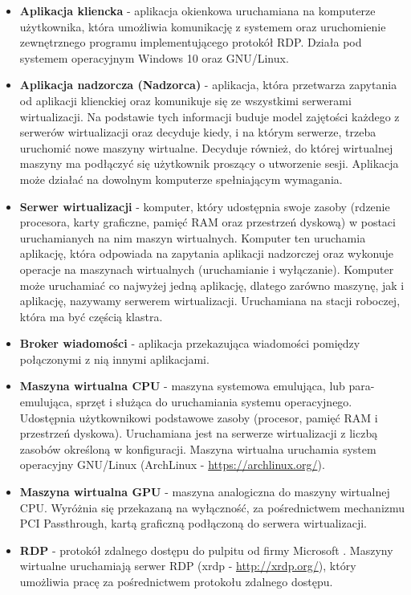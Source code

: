 \documentclass[../wstep.tex]{subfiles}
\begin{document}
\begin{itemize}
  \item \textbf{Aplikacja kliencka} - aplikacja okienkowa uruchamiana na komputerze użytkownika, która umożliwia komunikację z systemem oraz uruchomienie zewnętrznego programu implementującego protokół RDP. Działa pod systemem operacyjnym Windows 10 oraz GNU/Linux.
  \item \textbf{Aplikacja nadzorcza (Nadzorca)} - aplikacja, która przetwarza zapytania od aplikacji klienckiej oraz komunikuje się ze wszystkimi serwerami wirtualizacji. Na podstawie tych informacji buduje model zajętości każdego z serwerów wirtualizacji oraz decyduje kiedy, i na którym serwerze, trzeba uruchomić nowe maszyny wirtualne. Decyduje również, do której wirtualnej maszyny ma podłączyć się użytkownik proszący o utworzenie sesji. Aplikacja może działać na dowolnym komputerze spełniającym wymagania.
  \item \textbf{Serwer wirtualizacji} - komputer, który udostępnia swoje zasoby (rdzenie procesora, karty graficzne, pamięć RAM oraz przestrzeń dyskową) w postaci uruchamianych na nim maszyn wirtualnych. Komputer ten uruchamia aplikację, która odpowiada na zapytania aplikacji nadzorczej oraz wykonuje operacje na maszynach wirtualnych (uruchamianie i wyłączanie). Komputer może uruchamiać co najwyżej jedną aplikację, dlatego zarówno maszynę, jak i aplikację, nazywamy serwerem wirtualizacji. Uruchamiana na stacji roboczej, która ma być częścią klastra.
  \item \textbf{Broker wiadomości} - aplikacja przekazująca wiadomości pomiędzy połączonymi z nią innymi aplikacjami.
  \item \textbf{Maszyna wirtualna CPU} - maszyna systemowa emulująca, lub para-emulująca, sprzęt i służąca do uruchamiania systemu operacyjnego. Udostępnia użytkownikowi podstawowe zasoby (procesor, pamięć RAM i przestrzeń dyskowa). Uruchamiana jest na serwerze wirtualizacji z liczbą zasobów określoną w konfiguracji. Maszyna wirtualna uruchamia system operacyjny GNU/Linux (ArchLinux - \url{https://archlinux.org/}).
  \item \textbf{Maszyna wirtualna GPU} - maszyna analogiczna do maszyny wirtualnej CPU. Wyróżnia się przekazaną na wyłączność, za pośrednictwem mechanizmu PCI Passthrough, kartą graficzną podłączoną do serwera wirtualizacji.
  \item \textbf{RDP} - protokół zdalnego dostępu do pulpitu od firmy Microsoft \parencite{rdp}. Maszyny wirtualne uruchamiają serwer RDP (xrdp - \url{http://xrdp.org/}), który umożliwia pracę za pośrednictwem protokołu zdalnego dostępu.

\end{itemize}
\end{document}
